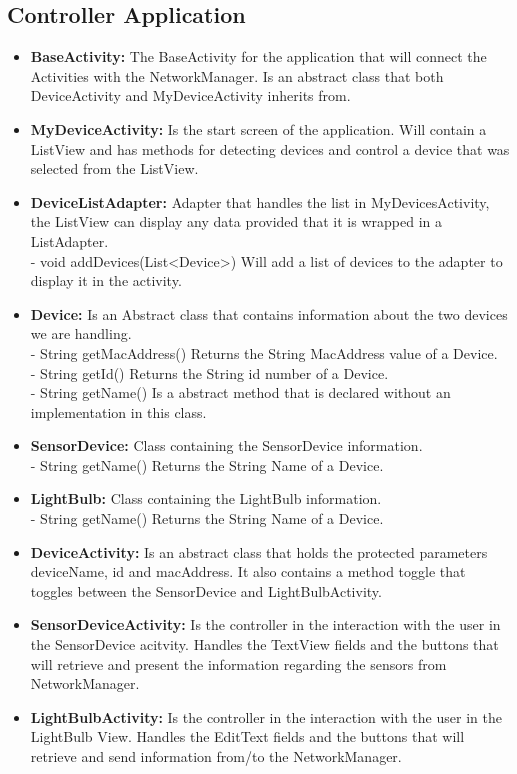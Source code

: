 \documentclass[a4paper]{article}
\begin{document}
	\subsection{Controller Application}
	\begin{itemize}
		\item{\textbf{BaseActivity:}} 
		The BaseActivity for the application that will connect the Activities with the NetworkManager. Is an abstract class that both DeviceActivity and MyDeviceActivity inherits from.
		\item{\textbf{MyDeviceActivity:}} 
		Is the start screen of the application. Will contain a ListView and has methods for detecting devices and control a device that was selected from the ListView.
		\item{\textbf{DeviceListAdapter:}} 
		Adapter that handles the list in MyDevicesActivity, the ListView can display any data provided that it is wrapped in a ListAdapter.\\ 
        - void addDevices(List<Device>) Will add a list of devices to the adapter to display it in the activity.
		\item{\textbf{Device:}} 
		Is an Abstract class that contains information about the two devices we are handling. \\
        - String getMacAddress() Returns the String MacAddress value of a Device.\\
        - String getId() Returns the String id number of a Device.\\
        - String getName() Is a abstract method that is declared without an implementation in this class.
		\item{\textbf{SensorDevice:}} 
		Class containing the SensorDevice information.\\
        - String getName() Returns the String Name of a Device.
		\item{\textbf{LightBulb:}}
		Class containing the LightBulb information.\\
        - String getName() Returns the String Name of a Device.
		\item{\textbf{DeviceActivity:}} 
		Is an abstract class that holds the protected parameters deviceName, id and macAddress. It also contains a method toggle that toggles between the SensorDevice and LightBulbActivity.
		\item{\textbf{SensorDeviceActivity:}} 
		Is the controller in the interaction with the user in the SensorDevice acitvity. Handles the TextView fields and the buttons that will retrieve and present the information regarding the sensors from NetworkManager.
		\item{\textbf{LightBulbActivity:}} 
		Is the controller in the interaction with the user in the LightBulb View. Handles the EditText fields and the buttons that will retrieve and send information from/to the NetworkManager.
		

\end{itemize}
\end{document}
